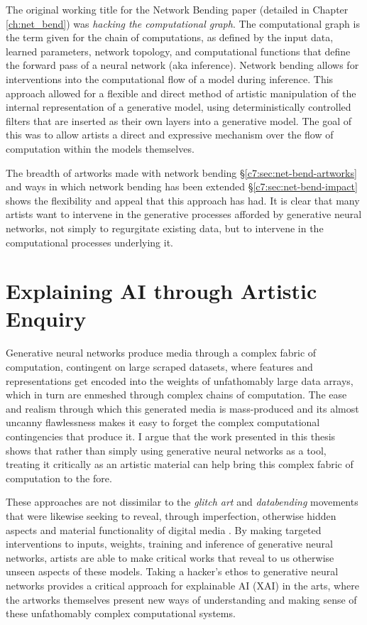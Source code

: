 The original working title for the Network Bending paper (detailed in Chapter \ref{ch:net_bend}) was \textit{hacking the computational graph}.
The computational graph is the term given for the chain of computations, as defined by the input data, learned parameters, network topology, and computational functions that define the forward pass of a neural network (aka inference). Network bending allows for interventions into the computational flow of a model during inference. 
This approach allowed for a flexible and direct method of artistic manipulation of the internal representation of a generative model, using deterministically controlled filters that are inserted as their own layers into a generative model.
The goal of this was to allow artists a direct and expressive mechanism over the flow of computation within the models themselves.

The breadth of artworks made with network bending \S \ref{c7:sec:net-bend-artworks} and ways in which network bending has been extended \S \ref{c7:sec:net-bend-impact} shows the flexibility and appeal that this approach has had.
It is clear that many artists want to intervene in the generative processes afforded by generative neural networks, not simply to regurgitate existing data, but to intervene in the computational processes underlying it.

\section{Explaining AI through Artistic Enquiry}
\label{c8:sec:explaining}

Generative neural networks produce media through a complex fabric of computation, contingent on large scraped datasets, where features and representations get encoded into the weights of unfathomably large data arrays, which in turn are enmeshed through complex chains of computation. 
The ease and realism through which this generated media is mass-produced and its almost uncanny flawlessness \citep{smith2023ai} makes it easy to forget the complex computational contingencies that produce it. 
I argue that the work presented in this thesis shows that rather than simply using generative neural networks as a tool, treating it critically as an artistic material can help bring this complex fabric of computation to the fore. 

These approaches are not dissimilar to the \textit{glitch art} and \textit{databending} movements that were likewise seeking to reveal, through imperfection, otherwise hidden aspects and material functionality of digital media \citep{kemper2023glitch}.
By making targeted interventions to inputs, weights, training and inference of generative neural networks, artists are able to make critical works that reveal to us otherwise unseen aspects of these models. 
Taking a hacker's ethos to generative neural networks provides a critical approach for explainable AI (XAI) in the arts,
where the artworks themselves present new ways of understanding and making sense of these unfathomably complex computational systems. 


